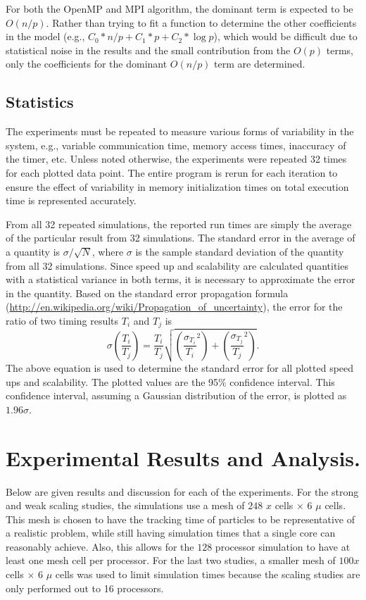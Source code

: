 \documentclass[12pt]{article}
\begin{document}
{{{For both the OpenMP and MPI algorithm, the dominant term is expected to be $O(n/p)$.
Rather than trying to fit a function to determine the other coefficients in the
model (e.g., $C_0*n/p+C_1*p + C_2*\log p$), which would be difficult due to statistical noise in the results and the small
contribution from the $O(p)$ terms, only the coefficients for the dominant $O(n/p)$
term are determined.  


\subsection{Statistics}

The experiments must be repeated to measure various forms of variability in the
system, e.g., variable communication time, memory access times, inaccuracy of the
timer, etc.  Unless noted otherwise, the experiments were repeated 32 times for each
plotted data point.  The entire program is rerun for each iteration to ensure the
effect of variability in memory initialization times on total execution time is represented
accurately.  

From all 32 repeated simulations, the reported run times are simply the average of
the particular result from 32
simulations. The standard error in the average of a quantity is $\sigma/\sqrt{N}$,
where $\sigma$ is the sample standard deviation of the quantity from all 32 simulations.  Since speed up and
scalability are calculated quantities with a statistical variance in both terms, it
is necessary to approximate the error in the quantity.  
Based on the standard error propagation formula
(\url{http://en.wikipedia.org/wiki/Propagation_of_uncertainty}), the error for the
ratio of two timing results $T_i$ and $T_j$ is
\begin{equation}
    \sigma \left( \frac{T_i}{T_j} \right) = \frac{T_i}{T_j}
    \sqrt{\left(\frac{\sigma_{T_i}}{T_i}^2\right) + 
    \left(\frac{\sigma_{T_j}}{T_j}^2\right)}
    \label{err}.
\end{equation}
The above equation is used to determine the standard error for all plotted speed ups
and scalability.  The plotted values are the 95\% confidence interval. This
confidence interval, assuming a
Gaussian distribution of the error, is plotted as $1.96 \sigma$.

\section{Experimental Results and Analysis.}

Below are given results and discussion for each of the experiments.  For the strong
and weak scaling studies, the simulations use a mesh of $248$ $x$ cells $\times$ $6$
$\mu$ cells.  This mesh is chosen to have the tracking time of
particles to be representative of a realistic problem, while still having simulation
times that a single core can reasonably achieve. Also, this allows for the $128$ processor simulation to have at least one
mesh cell per processor.  For the last two studies, a smaller mesh of $100 x$ cells
$\times$ $6$ $\mu$ cells was used to limit simulation times because the scaling studies are only performed out
to 16 processors. 

}}}
\end{document}
